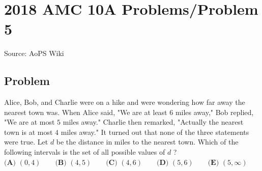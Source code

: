\documentclass[12pt]{article}
\begin{document}
\section*{{2018 AMC 10A Problems/Problem 5}}
Source: AoPS Wiki

\subsection*{Problem}
Alice, Bob, and Charlie were on a hike and were wondering how far away the nearest town was. When Alice said, "We are at least $6$ miles away," Bob replied, "We are at most $5$ miles away." Charlie then remarked, "Actually the nearest town is at most $4$ miles away." It turned out that none of the three statements were true. Let $d$ be the distance in miles to the nearest town. Which of the following intervals is the set of all possible values of $d$ ? $\textbf{(A) } (0,4) \qquad \textbf{(B) } (4,5) \qquad \textbf{(C) } (4,6) \qquad \textbf{(D) } (5,6) \qquad \textbf{(E) } (5,\infty)$
\end{document}
